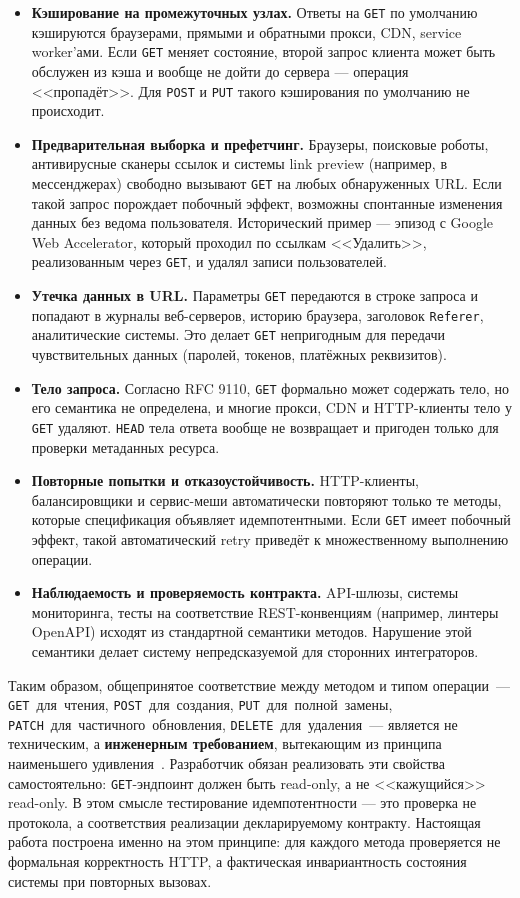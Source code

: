 \begin{itemize}
    \item \textbf{Кэширование на промежуточных узлах.} Ответы на \texttt{GET} по умолчанию кэшируются браузерами, прямыми и обратными прокси, CDN, service worker'ами. Если \texttt{GET} меняет состояние, второй запрос клиента может быть обслужен из кэша и вообще не дойти до сервера --- операция <<пропадёт>>. Для \texttt{POST} и \texttt{PUT} такого кэширования по умолчанию не происходит.
    \item \textbf{Предварительная выборка и префетчинг.} Браузеры, поисковые роботы, антивирусные сканеры ссылок и системы link preview (например, в мессенджерах) свободно вызывают \texttt{GET} на любых обнаруженных URL. Если такой запрос порождает побочный эффект, возможны спонтанные изменения данных без ведома пользователя. Исторический пример --- эпизод с Google Web Accelerator, который проходил по ссылкам <<Удалить>>, реализованным через \texttt{GET}, и удалял записи пользователей.
    \item \textbf{Утечка данных в URL.} Параметры \texttt{GET} передаются в строке запроса и попадают в журналы веб-серверов, историю браузера, заголовок \texttt{Referer}, аналитические системы. Это делает \texttt{GET} непригодным для передачи чувствительных данных (паролей, токенов, платёжных реквизитов).
    \item \textbf{Тело запроса.} Согласно RFC 9110, \texttt{GET} формально может содержать тело, но его семантика не определена, и многие прокси, CDN и HTTP-клиенты тело у \texttt{GET} удаляют. \texttt{HEAD} тела ответа вообще не возвращает и пригоден только для проверки метаданных ресурса.
    \item \textbf{Повторные попытки и отказоустойчивость.} HTTP-клиенты, балансировщики и сервис-меши автоматически повторяют только те методы, которые спецификация объявляет идемпотентными. Если \texttt{GET} имеет побочный эффект, такой автоматический retry приведёт к множественному выполнению операции.
    \item \textbf{Наблюдаемость и проверяемость контракта.} API-шлюзы, системы мониторинга, тесты на соответствие REST-конвенциям (например, линтеры OpenAPI) исходят из стандартной семантики методов. Нарушение этой семантики делает систему непредсказуемой для сторонних интеграторов.
\end{itemize}

Таким образом, общепринятое соответствие между методом и типом операции~--- \texttt{GET}~для~чтения, \texttt{POST}~для~создания, \texttt{PUT}~для~полной~замены, \texttt{PATCH}~для~частичного~обновления, \texttt{DELETE}~для~удаления~--- является не техническим, а \textbf{инженерным требованием}, вытекающим из принципа наименьшего удивления~\cite{richardson2013restful}. Разработчик обязан реализовать эти свойства самостоятельно: \texttt{GET}-эндпоинт должен быть read-only, а не <<кажущийся>> read-only. В этом смысле тестирование идемпотентности --- это проверка не протокола, а соответствия реализации декларируемому контракту. Настоящая работа построена именно на этом принципе: для каждого метода проверяется не формальная корректность HTTP, а фактическая инвариантность состояния системы при повторных вызовах.

